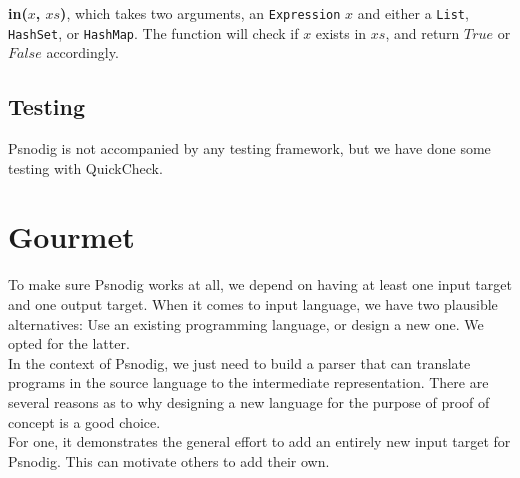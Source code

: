 \textbf{in($x$, $xs$)}, which takes two arguments, an \texttt{Expression} $x$ and either a \texttt{List}, \texttt{HashSet}, or \texttt{HashMap}. The function will check if $x$ exists in $xs$, and return $True$ or $False$ accordingly.

\subsection{Testing}

Psnodig is not accompanied by any testing framework, but we have done some testing with QuickCheck. \hfill \\




\section{Gourmet}

To make sure Psnodig works at all, we depend on having at least one input target and one output target. When it comes to input language, we have two plausible alternatives: Use an existing programming language, or design a new one. We opted for the latter. \hfill \\

In the context of Psnodig, we just need to build a parser that can translate programs in the source language to the intermediate representation. There are several reasons as to why designing a new language for the purpose of proof of concept is a good choice. \hfill \\

For one, it demonstrates the general effort to add an entirely new input target for Psnodig. This can motivate others to add their own. \hfill \\

